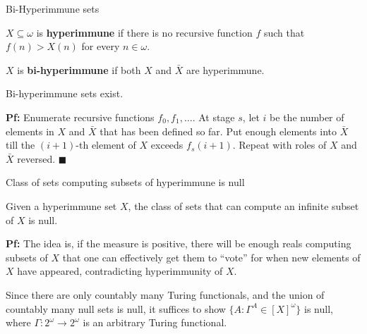 \begin{frame}{Bi-Hyperimmune sets}
  \begin{define}
    $X\subseteq\omega$ is \textbf{hyperimmune} if there is no recursive
    function $f$ such that $f(n)>X(n)$ for every $n\in\omega$.
  \end{define}

  \begin{define}
    $X$ is \textbf{bi-hyperimmune} if both $X$ and $\bar{X}$ are hyperimmune.
  \end{define}

  \begin{thm}
    Bi-hyperimmune sets exist.
  \end{thm}

  \vspace{0.5em}
  \textbf{Pf:} Enumerate recursive functions $f_0,f_1,\ldots$. At stage
  $s$, let $i$ be the number of elements in $X$ and $\bar{X}$ that has been
  defined so far. Put enough elements into $\bar{X}$ till the $(i+1)$-th
  element of $X$ exceeds $f_s(i+1)$. Repeat with roles of $X$ and $\bar{X}$
  reversed. $\blacksquare$
\end{frame}

\begin{frame}{Class of sets computing subsets of hyperimmune is null}
  \begin{thm}
    \label{thm:bihyper-null}
    Given a hyperimmune set $X$, the class of sets that can compute an
    infinite subset of $X$ is null.
  \end{thm}

  \vspace{1em}
  \textbf{Pf:} The idea is, if the measure is positive, there will be
  enough reals computing subsets of $X$ that one can effectively get them
  to ``vote'' for when new elements of $X$ have appeared, contradicting
  hyperimmunity of $X$.

  \vspace{1em}
  Since there are only countably many Turing functionals, and the union of
  countably many null sets is null, it suffices to show $\{A:
  \Gamma^A\in[X]^\omega\}$ is null, where
  $\Gamma:2^\omega\rightarrow2^\omega$ is an arbitrary Turing functional.
\end{frame}

